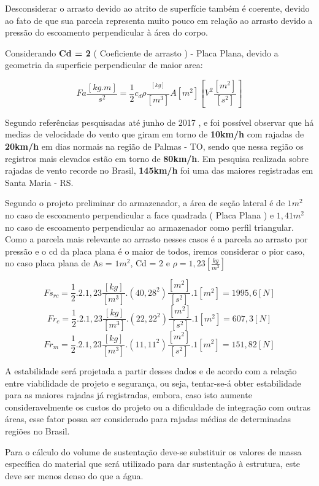 Desconsiderar o arrasto devido ao atrito de superfície também é coerente, devido ao fato de que sua parcela representa muito pouco em relação ao arrasto devido a pressão do escoamento perpendicular à área do corpo.

Considerando \textbf{Cd = 2} ( Coeficiente de arrasto ) - Placa Plana, devido a geometria da superficie perpendicular de maior area:

\[Fa\frac{[kg.m]}{s^2} = \frac{1}{2}{c_{d}}\rho\frac{^[kg]}{[m^3]}A[m^2][V^2\frac{[m^2]}{[s^2]}]\]

Segundo referências pesquisadas até junho de 2017 \cite{tempo},\cite{globo} e \cite{vento}  foi possível observar que há medias de velocidade do vento que giram em torno de \textbf{10km/h} com rajadas de \textbf{20km/h} em dias normais na região de Palmas - TO, sendo que nessa região os registros mais elevados estão em torno de \textbf{80km/h}. Em pesquisa realizada sobre rajadas de vento recorde no Brasil, \textbf{145km/h} foi uma das maiores registradas em Santa Maria - RS.

Segundo o projeto preliminar do armazenador, a área de seção lateral é de $1m^2$ no caso de escoamento perpendicular a face quadrada ( Placa Plana ) e $1,41m^2$ no caso de escoamento perpendicular ao armazenador como perfil triangular. Como a parcela mais relevante ao arrasto nesses casos é a parcela ao arrasto por pressão e o cd da placa plana é o maior de todos, iremos considerar o pior caso, no caso placa plana de As = $1m^2$,  Cd = 2 e $\rho = 1,23 [\frac{kg}{m^3}]$

\[Fs_{rc} = \frac{1}{2}.2.1,23 \frac{[kg]}{[m^3]}.(40,28^2)\frac{[m^2]}{[s^2]} .1[m^2] = 1995,6[N]\]
\[Fr_{c} = \frac{1}{2}.2.1,23 \frac{[kg]}{[m^3]}.(22,22^2)\frac{[m^2]}{[s^2]} .1[m^2] = 607,3[N]\]
\[Fr_{m} = \frac{1}{2}.2.1,23 \frac{[kg]}{[m^3]}.(11,11^2)\frac{[m^2]}{[s^2]} .1[m^2] = 151,82[N]\]

A estabilidade será projetada a partir desses dados e de acordo com a relação entre viabilidade de projeto e segurança, ou seja, tentar-se-á obter estabilidade para as maiores rajadas já registradas, embora, caso isto aumente consideravelmente os custos do projeto ou a dificuldade de integração com outras áreas, esse fator possa ser considerado para rajadas médias de determinadas regiões no Brasil.

Para o cálculo do volume de sustentação deve-se substituir os valores de massa específica do material que será utilizado para dar sustentação à estrutura, este deve ser menos denso do que a água.

